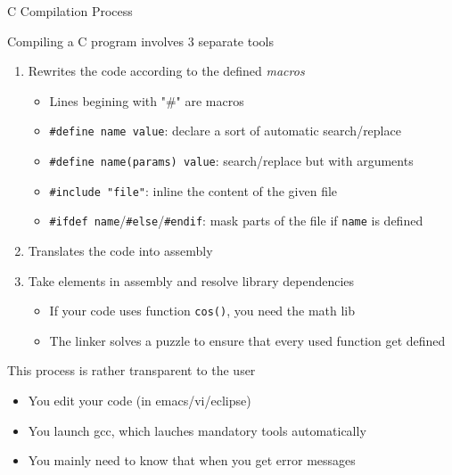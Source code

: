 \begin{frame}{C Compilation Process}
  \begin{block}{Compiling a C program involves 3 separate tools}
    \begin{enumerate}
    \item {} Rewrites the code according to the defined
      \textit{\alert{macros}}
      \begin{itemize}
      \item Lines begining with "\#" are macros
      \item \texttt{\#define name value}: declare a sort of automatic
        search/replace
      \item \texttt{\#define name(params) value}: search/replace but with
        arguments
      \item \texttt{\#include "file"}: inline the content of the given file
      \item \texttt{\#ifdef name}/\texttt{\#else}/\texttt{\#endif}: mask parts
        of the file if \texttt{name} is defined
      \end{itemize}
    \item {} Translates the code into assembly
    \item {} Take elements in assembly and resolve library
      dependencies
      \begin{itemize}
      \item If your code uses function \texttt{cos()}, you need the math lib
      \item The linker solves a puzzle to ensure that every used function get
        defined 
      \end{itemize}
    \end{enumerate}
  \end{block}

  \begin{block}{This process is rather transparent to the user}
    \begin{itemize}
    \item You edit your code (in emacs/vi/eclipse)
    \item You launch gcc, which lauches mandatory tools automatically
    \item You mainly need to know that when you get error messages
    \end{itemize}
  \end{block}
\end{frame}
